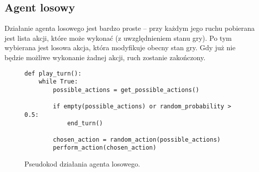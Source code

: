 \subsection{Agent losowy}

Działanie agenta losowego jest bardzo proste -- przy każdym jego ruchu pobierana jest lista akcji, które może wykonać (z uwzględnieniem stanu gry). Po tym wybierana jest losowa akcja, która modyfikuje obecny stan gry. Gdy już nie będzie możliwe wykonanie żadnej akcji, ruch zostanie zakończony.

\begin{figure}[H]
	\begin{verbatim}
def play_turn():
	while True:
		possible_actions = get_possible_actions()
		
		if empty(possible_actions) or random_probability > 0.5:
			end_turn()
	
		chosen_action = random_action(possible_actions)
		perform_action(chosen_action)
	\end{verbatim}
	\caption{Pseudokod działania agenta losowego.}
\end{figure}